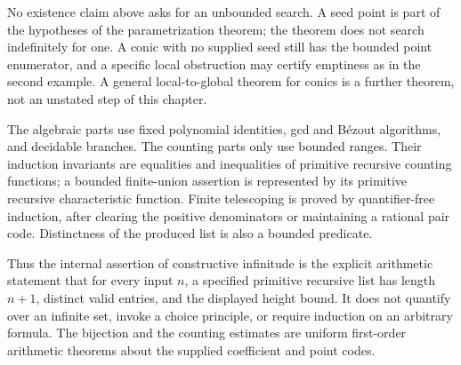 No existence claim above asks for an unbounded search.  A seed point
is part of the hypotheses of the parametrization theorem; the
theorem does not search indefinitely for one.  A conic with no
supplied seed still has the bounded point enumerator, and a
specific local obstruction may certify emptiness as in the second
example.  A general local-to-global theorem for conics is a further
theorem, not an unstated step of this chapter.

The algebraic parts use fixed polynomial identities, gcd and
B\'ezout algorithms, and decidable branches.  The counting parts
only use bounded ranges.  Their induction invariants are equalities
and inequalities of primitive recursive counting functions; a
bounded finite-union assertion is represented by its primitive
recursive characteristic function.  Finite telescoping is proved
by quantifier-free induction, after clearing the positive
denominators or maintaining a rational pair code.  Distinctness of
the produced list is also a bounded predicate.

Thus the internal assertion of constructive infinitude is the
explicit arithmetic statement that for every input $n$, a specified
primitive recursive list has length $n+1$, distinct valid entries,
and the displayed height bound.  It does not quantify over an
infinite set, invoke a choice principle, or require induction on
an arbitrary formula.  The bijection and the counting estimates
are uniform first-order arithmetic theorems about the supplied
coefficient and point codes.

